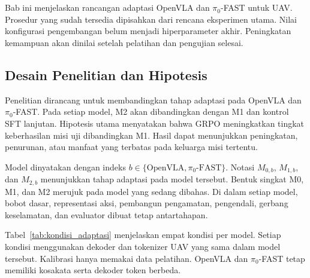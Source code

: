 \chapter{\babTiga}
\label{cha:metodologi}
Bab ini menjelaskan rancangan adaptasi OpenVLA dan $\pi_0$-FAST untuk UAV. Prosedur yang sudah tersedia dipisahkan dari rencana eksperimen utama. Nilai konfigurasi pengembangan belum menjadi hiperparameter akhir. Peningkatan kemampuan akan dinilai setelah pelatihan dan pengujian selesai.

\section{Desain Penelitian dan Hipotesis}
\label{sec:desain_penelitian}
Penelitian dirancang untuk membandingkan tahap adaptasi pada OpenVLA dan $\pi_0$-FAST. Pada setiap model, M2 akan dibandingkan dengan M1 dan kontrol SFT lanjutan. Hipotesis utama menyatakan bahwa GRPO meningkatkan tingkat keberhasilan misi uji dibandingkan M1. Hasil dapat menunjukkan peningkatan, penurunan, atau manfaat yang terbatas pada keluarga misi tertentu.

Model dinyatakan dengan indeks $b\in\{\mathrm{OpenVLA},\pi_0\text{-FAST}\}$. Notasi $M_{0,b}$, $M_{1,b}$, dan $M_{2,b}$ menunjukkan tahap adaptasi pada model tersebut. Bentuk singkat M0, M1, dan M2 merujuk pada model yang sedang dibahas. Di dalam setiap model, bobot dasar, representasi aksi, pembangun pengamatan, pengendali, gerbang keselamatan, dan evaluator dibuat tetap antartahapan.

Tabel~\ref{tab:kondisi_adaptasi} menjelaskan empat kondisi per model. Setiap kondisi menggunakan dekoder dan tokenizer UAV yang sama dalam model tersebut. Kalibrasi hanya memakai data pelatihan. OpenVLA dan $\pi_0$-FAST tetap memiliki kosakata serta dekoder token berbeda.


